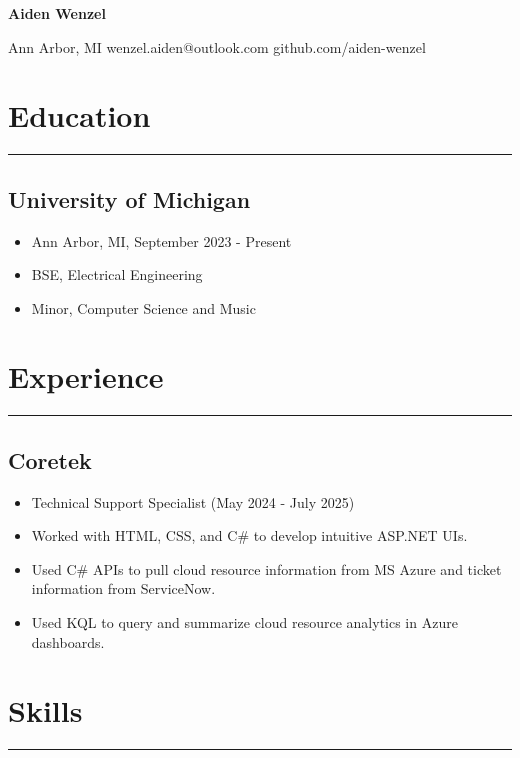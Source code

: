 \documentclass[10pt, letterpaper]{article}
\begin{document}
\thispagestyle{empty}
\begin{center}
	\textbf{\huge{Aiden Wenzel}}
	\vspace{3pt}
	
	Ann Arbor, MI \hspace{5pt} wenzel.aiden@outlook.com \hspace{5pt} github.com/aiden-wenzel
\end{center}

\section*{Education}
\hrule
\vspace{3pt}

\subsection*{University of Michigan}
\begin{itemize}[noitemsep]
	\item Ann Arbor, MI, September 2023 - Present
	\item BSE, Electrical Engineering
	\item Minor, Computer Science and Music
\end{itemize}

\section*{Experience}
\hrule
\vspace{3pt}

\subsection*{Coretek}
\begin{itemize}[noitemsep]
	\item Technical Support Specialist (May 2024 - July 2025)
	\item Worked with HTML, CSS, and C\# to develop intuitive ASP.NET UIs.
	\item Used C\# APIs to pull cloud resource information from MS Azure and ticket information from ServiceNow.
	\item Used KQL to query and summarize cloud resource analytics in Azure dashboards.
\end{itemize}

\section*{Skills}
\hrule
\vspace{3pt}
\end{document}
